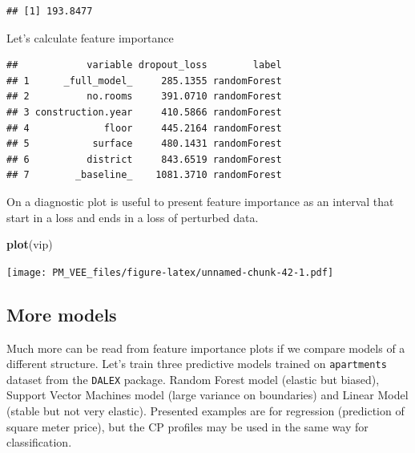 \documentclass[]{krantz}
\newenvironment{Shaded}{\begin{snugshade}}{\end{snugshade}}
\newcommand{\DataTypeTok}[1]{\textcolor[rgb]{0.13,0.29,0.53}{#1}}
\newcommand{\DecValTok}[1]{\textcolor[rgb]{0.00,0.00,0.81}{#1}}
\newcommand{\KeywordTok}[1]{\textcolor[rgb]{0.13,0.29,0.53}{\textbf{#1}}}
\newcommand{\NormalTok}[1]{#1}
\newcommand{\OperatorTok}[1]{\textcolor[rgb]{0.81,0.36,0.00}{\textbf{#1}}}
\newcommand{\StringTok}[1]{\textcolor[rgb]{0.31,0.60,0.02}{#1}}
\theoremstyle{definition}
\theoremstyle{definition}
\theoremstyle{definition}
\theoremstyle{remark}
\begin{document}
\begin{verbatim}
## [1] 193.8477
\end{verbatim}

Let's calculate feature importance

\begin{Shaded}
\end{Shaded}

\begin{verbatim}
##            variable dropout_loss        label
## 1      _full_model_     285.1355 randomForest
## 2          no.rooms     391.0710 randomForest
## 3 construction.year     410.5866 randomForest
## 4             floor     445.2164 randomForest
## 5           surface     480.1431 randomForest
## 6          district     843.6519 randomForest
## 7        _baseline_    1081.3710 randomForest
\end{verbatim}

On a diagnostic plot is useful to present feature importance as an
interval that start in a loss and ends in a loss of perturbed data.

\begin{Shaded}
\begin{Highlighting}[]
\KeywordTok{plot}\NormalTok{(vip)}
\end{Highlighting}
\end{Shaded}

\texttt{[image: PM\_VEE\_files/figure-latex/unnamed-chunk-42-1.pdf]}

\hypertarget{more-models}{%
\subsection{More models}\label{more-models}}

Much more can be read from feature importance plots if we compare models
of a different structure. Let's train three predictive models trained on
\texttt{apartments} dataset from the \texttt{DALEX} package. Random
Forest model \citep{R-randomForest} (elastic but biased), Support Vector
Machines model \citep{R-e1071} (large variance on boundaries) and Linear
Model (stable but not very elastic). Presented examples are for
regression (prediction of square meter price), but the CP profiles may
be used in the same way for classification.
\end{document}
